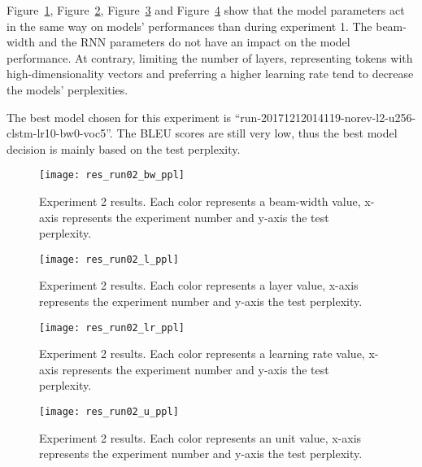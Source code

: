 Figure~\ref{fig:res_run02_bw_ppl}, Figure~\ref{fig:res_run02_l_ppl}, Figure~\ref{fig:res_run02_lr_ppl} and Figure~\ref{fig:res_run02_u_ppl} show that the model parameters act in the same way on models' performances than during experiment 1. The beam-width and the RNN parameters do not have an impact on the model performance. At contrary, limiting the number of layers, representing tokens with high-dimensionality vectors and preferring a higher learning rate tend to decrease the models' perplexities.

The best model chosen for this experiment is ``run-20171212014119-norev-l2-u256-clstm-lr10-bw0-voc5''. The BLEU scores are still very low, thus the best model decision is mainly based on the test perplexity.

\begin{landscape}
\begin{figure}
    \centering
    \texttt{[image: res\_run02\_bw\_ppl]}
    \decoRule
    \caption[Results experiment 2 BW-PPL]{Experiment 2 results. Each color represents a beam-width value, x-axis represents the experiment number and y-axis the test perplexity.}
    \label{fig:res_run02_bw_ppl}
\end{figure}
\begin{figure}
    \centering
    \texttt{[image: res\_run02\_l\_ppl]}
    \decoRule
    \caption[Results experiment 2 L-PPL]{Experiment 2 results. Each color represents a layer value, x-axis represents the experiment number and y-axis the test perplexity.}
    \label{fig:res_run02_l_ppl}
\end{figure}
\begin{figure}
    \centering
    \texttt{[image: res\_run02\_lr\_ppl]}
    \decoRule
    \caption[Results experiment 2 LR-PPL]{Experiment 2 results. Each color represents a learning rate value, x-axis represents the experiment number and y-axis the test perplexity.}
    \label{fig:res_run02_lr_ppl}
\end{figure}
\begin{figure}
    \centering
    \texttt{[image: res\_run02\_u\_ppl]}
    \decoRule
    \caption[Results experiment 2 U-PPL]{Experiment 2 results. Each color represents an unit value, x-axis represents the experiment number and y-axis the test perplexity.}
    \label{fig:res_run02_u_ppl}
\end{figure}
\end{landscape}


